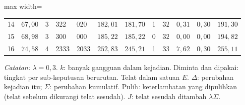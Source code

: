 \begin{table}[htbp]
\begin{adjustbox}{max width=\textwidth}
\begin{tabular}{rrcllrrrrrrr}
14 & $67{,}00$ & 3 & 322 & 020 & $182{,}01$ & $181{,}70$ & 1 & 32 & $0{,}31$ & $0{,}30$ & $191{,}30$ \\
15 & $68{,}98$ & 3 & 300 & 000 & $185{,}22$ & $185{,}22$ & 0 & 32 & $0{,}00$ & $0{,}00$ & $194{,}82$ \\
16 & $74{,}58$ & 4 & 2333 & 2033 & $252{,}83$ & $245{,}21$ & 1 & 33 & $7{,}62$ & $0{,}30$ & $255{,}11$ \\
\bottomrule
\end{tabular}
\end{adjustbox}
\par\smallskip\footnotesize\textit{Catatan:} $\lambda = 0{,}3$. $k$: banyak gangguan dalam kejadian. Diminta dan dipakai: tingkat per sub-keputusan berurutan. Telat dalam satuan $E$. $\Delta$: perubahan kejadian itu; $\Sigma$: perubahan kumulatif. Pulih: keterlambatan yang dipulihkan (telat sebelum dikurangi telat sesudah). $J$: telat sesudah ditambah $\lambda\Sigma$.
\end{table}
